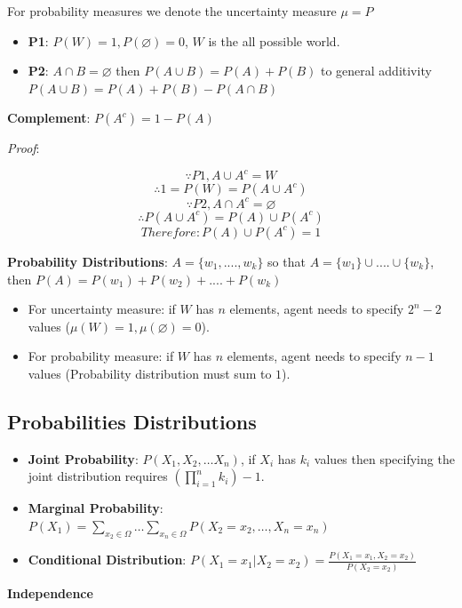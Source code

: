 \documentclass{article}
\begin{document}
For probability measures we denote the uncertainty measure $\mu = P$

\begin{itemize}
    \item \textbf{P1}: $P(W) = 1, P(\varnothing) = 0$, $W$ is the all possible world.
    \item \textbf{P2}: $A \cap B = \varnothing$ then $P(A \cup B) = P(A) + P(B)$ to general additivity $P(A \cup B) = P(A) + P(B) - P(A \cap B)$
\end{itemize}

\textbf{Complement}: $P(A^c) = 1 - P(A)$

\textit{Proof}:

$$\because  P1, A \cup A^c=W$$
$$\therefore 1 = P(W) = P(A \cup A^c)$$
$$\because P2, A \cap A^c = \varnothing$$
$$\therefore P(A \cup A^c) = P(A) \cup P(A^c)$$
$$Therefore: P(A) \cup P(A^c) = 1$$

\textbf{Probability Distributions}: $A = \{w_1, ...., w_k\}$ so that $A = \{w_1\} \cup ....\cup \{w_k\}$, then $P(A) = P(w_1) + P(w_2) + .... + P(w_k)$

\begin{itemize}
    \item For uncertainty measure: if $W$ has $n$ elements, agent needs to specify $2^n - 2$ values ($\mu(W) = 1, \mu(\varnothing) = 0$).
    \item For probability measure: if $W$ has $n$ elements, agent needs to specify $n-1$ values (Probability distribution must sum to $1$).
\end{itemize}


\subsection{Probabilities Distributions}

\begin{itemize}
    \item \textbf{Joint Probability}: $P(X_1, X_2, \dots X_n)$, if $X_i$ has $k_i$ values then specifying the joint distribution requires $(\prod_{i=1}^{n}k_i)-1$.
    \item \textbf{Marginal Probability}: $P(X_1) = \sum_{x_2 \in \Omega} \dots \sum_{x_n \in \Omega}P(X_2=x_2, \dots, X_n=x_n)$
    \item \textbf{Conditional Distribution}: $P(X_1=x_1 | X_2=x_2) = \frac{P(X_1=x_1, X_2=x_2)}{P(X_2=x_2)}$
\end{itemize}

\textbf{Independence}
\end{document}
